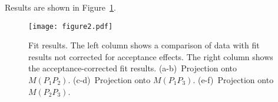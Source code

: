 \documentclass[11pt]{article}
\begin{document}
Results are shown in Figure~\ref{fig:results}.

\newpage
\begin{figure}[h!]
\begin{center}
\texttt{[image: figure2.pdf]}
\caption{Fit results.  The left column shows a comparison of data with fit results not corrected for acceptance effects.  The right column shows the acceptance-corrected fit results.  (a-b)~Projection onto $M(P_1P_2)$.  (c-d)~Projection onto $M(P_1P_3)$.  (e-f)~Projection onto $M(P_2P_3)$.
\label{fig:results}}
\end{center}
\end{figure}
\end{document}
